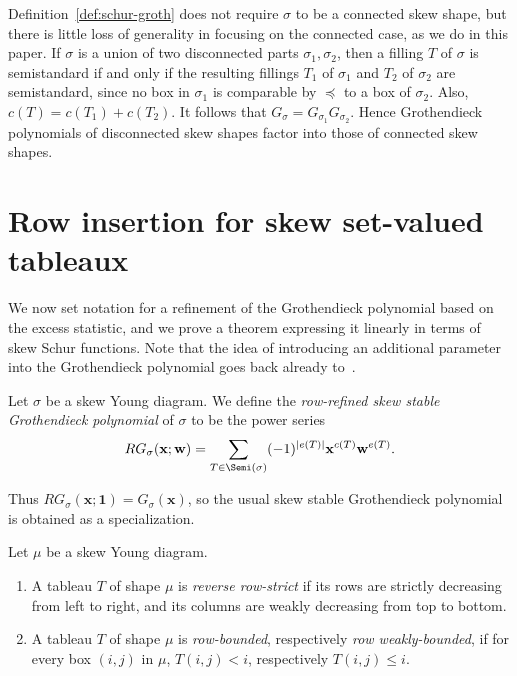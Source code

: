 \begin{rema} \label{rem:disconn}
Definition~\ref{def:schur-groth} does not require $\sigma$ to be a connected skew shape, but there is little loss of generality in focusing on the connected case, as we do in this paper. If $\sigma$ is a union of two disconnected parts $\sigma_1, \sigma_2$, then a filling $T$ of $\sigma$ is semistandard if and only if the resulting fillings $T_1$ of $\sigma_1$ and $T_2$ of $\sigma_2$ are semistandard, since no box in $\sigma_1$ is comparable by $\preceq$ to a box of $\sigma_2$. Also, $c(T) = c(T_1) + c(T_2)$. It follows that $G_\sigma = G_{\sigma_1} G_{\sigma_2}$. Hence Grothendieck polynomials of disconnected skew shapes factor into those of connected skew shapes.
\end{rema}

\section{Row insertion for skew set-valued tableaux}

We now set notation for a refinement of the Grothendieck polynomial based on the excess statistic, and we prove a theorem expressing it linearly in terms of skew Schur functions. Note that the idea of introducing an additional parameter into the Grothendieck polynomial goes back already to~\cite{fomin-kirillov-grothendieck}.

\begin{defi} \label{def:rg} Let $\sigma$ be a skew Young diagram.
We define the \emph{row-refined skew stable Grothendieck polynomial} of $\sigma$ to be the power series 
\[
RG_\sigma(\mathbf{x};\mathbf{w}) = \sum_{T\in \Semi(\sigma)} (-1)^{|e(T)|} \mathbf{x}^{c(T)} \mathbf{w}^{e(T)}.
\]
\end{defi}
\noindent Thus $RG_\sigma(\mathbf{x};\mathbf{1}) = G_\sigma(\mathbf{x})$, so the usual skew stable Grothendieck polynomial is obtained as a specialization.


\begin{defi}Let $\mu$ be a skew Young diagram.
\begin{enumerate}
\item\label{defi3.2_1} A tableau $T$ of shape $\mu$ is \emph{reverse row-strict} if its rows are strictly decreasing from left to right, and its columns are weakly decreasing from top to bottom. 
\item\label{defi3.2_2} A tableau $T$ of shape $\mu$ is \emph{row-bounded}, respectively \emph{row weakly-bounded}, if for every box $(i,j)$ in $\mu$, $T(i,j) < i$, respectively $T(i,j)\le i$.
\end{enumerate}
\end{defi}

